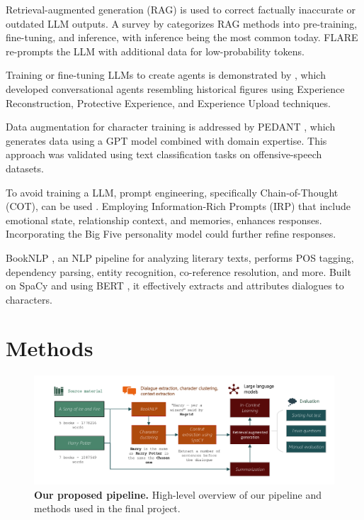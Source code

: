 \documentclass[fleqn,moreauthors,10pt]{ds_report}
\begin{document}
Retrieval-augmented generation (RAG) is used to correct factually inaccurate or outdated LLM outputs. A survey by \cite{gao2023retrieval} categorizes RAG methods into pre-training, fine-tuning, and inference, with inference being the most common today. FLARE \cite{jiang2023active} re-prompts the LLM with additional data for low-probability tokens.

Training or fine-tuning LLMs to create agents is demonstrated by \cite{shao2023characterllm}, which developed conversational agents resembling historical figures using Experience Reconstruction, Protective Experience, and Experience Upload techniques.

Data augmentation for character training is addressed by PEDANT \cite{neuman2023data}, which generates data using a GPT model combined with domain expertise. This approach was validated using text classification tasks on offensive-speech datasets.

To avoid training a LLM, prompt engineering, specifically Chain-of-Thought (COT), can be used \cite{jeong2023chatbot}. Employing Information-Rich Prompts (IRP) that include emotional state, relationship context, and memories, enhances responses. Incorporating the Big Five personality model \cite{goldberg1990thebigfive} could further refine responses.

BookNLP \cite{booknlp}, an NLP pipeline for analyzing literary texts, performs POS tagging, dependency parsing, entity recognition, co-reference resolution, and more. Built on SpaCy \cite{spacy2} and using BERT \cite{joshi2019bert}, it effectively extracts and attributes dialogues to characters.

\section*{Methods}

\begin{figure}[htp]
	\centering
	\includegraphics[width=\linewidth]{pipeline.pdf}
	\caption{\textbf{Our proposed pipeline.} High-level overview of our pipeline and methods used in the final project.}
	\label{fig:pipeline}
\end{figure}
\end{document}

